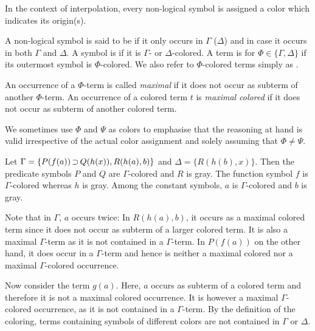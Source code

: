 In the context of interpolation, every non-logical symbol is assigned a color which indicates its origin(s). 
\begin{defi}[Coloring]
	\label{def:coloring}
A non-logical symbol is said to be  if it only occurs in $\Gamma$ ($\Delta$) and  in case it occurs in both $\Gamma$ and $\Delta$. A symbol is  if it is $\Gamma$- or $\Delta$-colored.
A term is  for $\Phi \in \{\Gamma, \Delta\}$ if its outermost symbol is $\Phi$-colored.
We also refer to $\Phi$-colored terms simply as .

An occurrence of a $\Phi$-term is called \emph{maximal} if it does not occur as subterm of another $\Phi$-term.
An occurrence of a colored term $t$ is \emph{maximal colored} if it does not occur as subterm of another colored term.
\end{defi}

We sometimes use $\Phi$ and $\Psi$ as colors to emphasise that the reasoning at hand is valid irrespective of the actual color assignment and solely assuming that $\Phi \neq \Psi$. 

\begin{exa}
	Let
	$\Gamma = \{ P(f(a)) \operatorname{\supset} Q(h(x)), R(h(a), b) \} $
	and 
	$\Delta = \{ R(h(b), x) \}$.
	Then the predicate symbols $P$ and $Q$ are $\Gamma$-colored and $R$ is gray.
	The function symbol $f$ is $\Gamma$-colored whereas $h$ is gray.
	Among the constant symbols, $a$ is $\Gamma$-colored and $b$ is gray.

	Note that in $\Gamma$, $a$ occurs twice:
	In $R(h(a), b)$, it occurs as a maximal colored term since it does not occur as subterm of a larger colored term.
	It is also a maximal $\Gamma$-term as it is not contained in a $\Gamma$-term.
	In $P(f(a))$ on the other hand, it does occur in a $\Gamma$-term and hence is neither a maximal colored nor a maximal $\Gamma$-colored occurrence.

	Now consider the term $g(a)$.
	Here, $a$ occurs as subterm of a colored term and therefore it is not a maximal colored occurrence.
	It is however a maximal $\Gamma$-colored occurrence, as it is not contained in a $\Gamma$-term. 
	By the definition of the coloring, terms containing symbols of different colors are not contained in $\Gamma$ or $\Delta$.
\end{exa}


